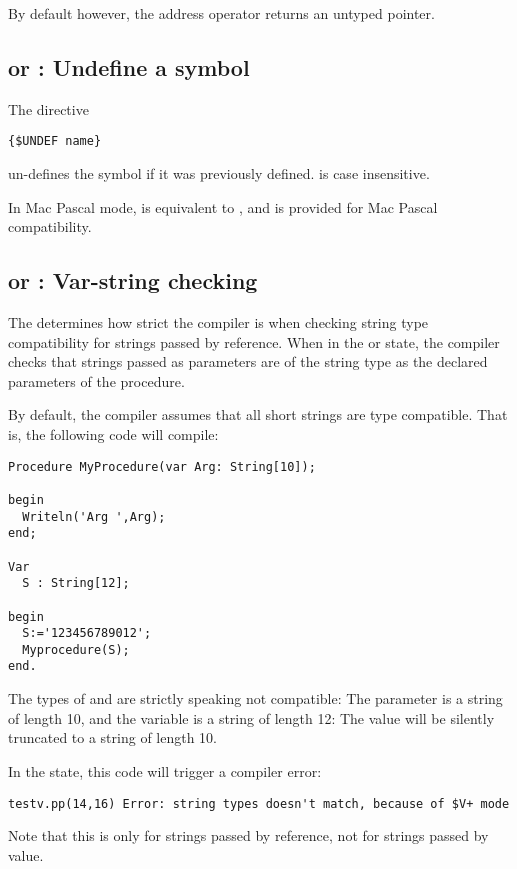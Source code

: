 By default however, the address operator returns an untyped pointer.

\subsection{ or  : Undefine a symbol}

The directive
\begin{verbatim}
{$UNDEF name}
\end{verbatim}
un-defines the symbol  if it was previously defined.
 is case insensitive.

In Mac Pascal mode,  is equivalent to , and is 
provided for Mac Pascal compatibility.


\subsection{ or  : Var-string checking}

The  determines how strict the compiler is when 
checking string type compatibility for strings passed by reference. When in the \var{+} or  state, 
the compiler checks that strings passed as parameters are of the string type as the declared
parameters of the procedure.

By default, the compiler assumes that all short strings are type compatible.
That is, the following code will compile:
\begin{verbatim}
Procedure MyProcedure(var Arg: String[10]);

begin
  Writeln('Arg ',Arg);
end;

Var
  S : String[12];

begin
  S:='123456789012';
  Myprocedure(S);
end.
\end{verbatim}
The types of  and  are strictly speaking not compatible:
The  parameter is a string of length 10, and the variable 
is a string of length 12: The value will be silently truncated to a string
of length 10.

In the  state, this code will trigger a compiler error:
\begin{verbatim}
testv.pp(14,16) Error: string types doesn't match, because of $V+ mode
\end{verbatim}
Note that this is only for strings passed by reference, not for strings
passed by value.

